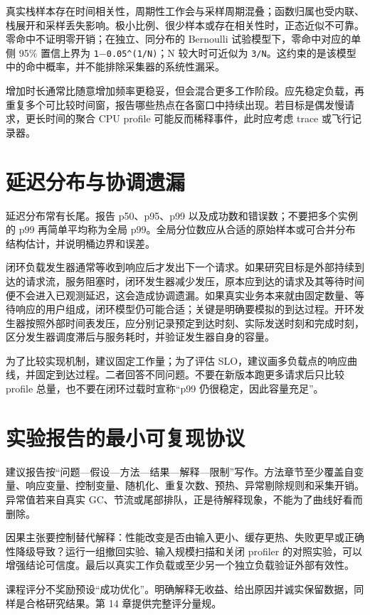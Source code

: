 \documentclass[UTF8,fontset=fandol,openany,11pt]{ctexbook}
\begin{document}
真实栈样本存在时间相关性，周期性工作会与采样周期混叠；函数归属也受内联、栈展开和采样丢失影响。极小比例、很少样本或存在相关性时，正态近似不可靠。零命中不证明零开销；在独立、同分布的 Bernoulli 试验模型下，零命中对应的单侧 95\% 置信上界为 \texttt{1\ensuremath{-}0.\allowbreak{}05\textasciicircum{}(1/\allowbreak{}N)}；N 较大时可近似为 \texttt{3/\allowbreak{}N}。这约束的是该模型中的命中概率，并不能排除采集器的系统性漏采。

增加时长通常比随意增加频率更稳妥，但会混合更多工作阶段。应先稳定负载，再重复多个可比较时间窗，报告哪些热点在各窗口中持续出现。若目标是偶发慢请求，更长时间的聚合 CPU profile 可能反而稀释事件，此时应考虑 trace 或飞行记录器。

\section{延迟分布与协调遗漏}
延迟分布常有长尾。报告 p50、p95、p99 以及成功数和错误数；不要把多个实例的 p99 再简单平均称为全局 p99。全局分位数应从合适的原始样本或可合并分布结构估计，并说明桶边界和误差。

闭环负载发生器通常等收到响应后才发出下一个请求。如果研究目标是外部持续到达的请求流，服务阻塞时，闭环发生器减少发压，原本应到达的请求及其等待时间便不会进入已观测延迟，这会造成协调遗漏。如果真实业务本来就由固定数量、等待响应的用户组成，闭环模型仍可能合适；关键是明确要模拟的到达过程。开环发生器按照外部时间表发压，应分别记录预定到达时刻、实际发送时刻和完成时刻，区分发生器调度滞后与服务耗时，并验证发生器自身的容量。

为了比较实现机制，建议固定工作量；为了评估 SLO，建议画多负载点的响应曲线，并固定到达过程。二者回答不同问题。不要在新版本跑更多请求后只比较 profile 总量，也不要在闭环过载时宣称“p99 仍很稳定，因此容量充足”。

\section{实验报告的最小可复现协议}
建议报告按“问题—假设—方法—结果—解释—限制”写作。方法章节至少覆盖自变量、响应变量、控制变量、随机化、重复次数、预热、异常剔除规则和采集开销。异常值若来自真实 GC、节流或尾部排队，正是待解释现象，不能为了曲线好看而删除。

因果主张要控制替代解释：性能改变是否由输入更小、缓存更热、失败更早或正确性降级导致？运行一组撤回实验、输入规模扫描和关闭 profiler 的对照实验，可以增强结论可信度。最后以真实工作负载或至少另一个独立负载验证外部有效性。

课程评分不奖励预设“成功优化”。明确解释无收益、给出原因并诚实保留数据，同样是合格研究结果。第 14 章提供完整评分量规。
\end{document}
